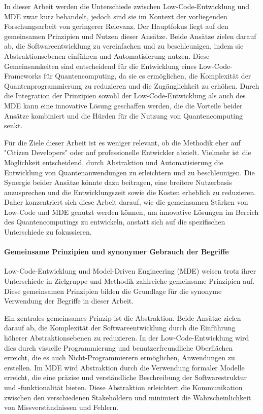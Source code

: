 In dieser Arbeit werden die Unterschiede zwischen Low-Code-Entwicklung und MDE zwar kurz behandelt, jedoch sind sie im Kontext 
der vorliegenden Forschungsarbeit von geringerer Relevanz. Der Hauptfokus liegt auf den gemeinsamen Prinzipien und Nutzen 
dieser Ansätze. Beide Ansätze zielen darauf ab, die Softwareentwicklung zu vereinfachen und zu beschleunigen, indem sie 
Abstraktionsebenen einführen und Automatisierung nutzen. Diese Gemeinsamkeiten sind entscheidend für die Entwicklung eines 
Low-Code-Frameworks für Quantencomputing, da sie es ermöglichen, die Komplexität der Quantenprogrammierung zu reduzieren 
und die Zugänglichkeit zu erhöhen. Durch die Integration der Prinzipien sowohl der Low-Code-Entwicklung als auch des MDE 
kann eine innovative Lösung geschaffen werden, die die Vorteile beider Ansätze kombiniert und die Hürden für die Nutzung 
von Quantencomputing senkt.

Für die Ziele dieser Arbeit ist es weniger relevant, ob die Methodik eher auf "Citizen Developers" oder auf professionelle 
Entwickler abzielt. Vielmehr ist die Möglichkeit entscheidend, durch Abstraktion und Automatisierung die Entwicklung 
von Quantenanwendungen zu erleichtern und zu beschleunigen. Die Synergie beider Ansätze könnte dazu beitragen, eine 
breitere Nutzerbasis anzusprechen und die Entwicklungszeit sowie die Kosten erheblich zu reduzieren. Daher konzentriert 
sich diese Arbeit darauf, wie die gemeinsamen Stärken von Low-Code und MDE genutzt werden können, um innovative Lösungen 
im Bereich des Quantencomputings zu entwickeln, anstatt sich auf die spezifischen Unterschiede zu fokussieren.

\paragraph{Gemeinsame Prinzipien und synonymer Gebrauch der Begriffe}
Low-Code-Entwicklung und Model-Driven Engineering (MDE) weisen trotz ihrer Unterschiede in Zielgruppe und Methodik zahlreiche 
gemeinsame Prinzipien auf. Diese gemeinsamen Prinzipien bilden die Grundlage für die synonyme Verwendung der Begriffe in dieser Arbeit.

Ein zentrales gemeinsames Prinzip ist die Abstraktion. Beide Ansätze zielen darauf ab, die Komplexität der Softwareentwicklung 
durch die Einführung höherer Abstraktionsebenen zu reduzieren. In der Low-Code-Entwicklung wird dies durch visuelle Programmierung 
und benutzerfreundliche Oberflächen erreicht, die es auch Nicht-Programmierern ermöglichen, Anwendungen zu erstellen. Im MDE 
wird Abstraktion durch die Verwendung formaler Modelle erreicht, die eine präzise und verständliche Beschreibung der 
Softwarestruktur und -funktionalität bieten. Diese Abstraktion erleichtert die Kommunikation zwischen den verschiedenen 
Stakeholdern und minimiert die Wahrscheinlichkeit von Missverständnissen und Fehlern.

